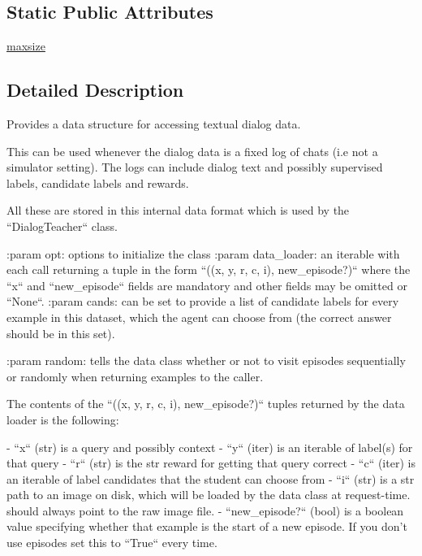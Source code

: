 \subsection*{Static Public Attributes}
\begin{DoxyCompactItemize}
\item 
\hyperlink{classparlai_1_1core_1_1teachers_1_1DialogData_a9c25f1914274bbc5b6aeae335e98957a}{maxsize}
\end{DoxyCompactItemize}


\subsection{Detailed Description}
\begin{DoxyVerb}Provides a data structure for accessing textual dialog data.

This can be used whenever the dialog data is a fixed log of chats
(i.e not a simulator setting). The logs can include dialog text and possibly
supervised labels, candidate labels and rewards.

All these are stored in this internal data format which is used by the
``DialogTeacher`` class.

:param opt:
    options to initialize the class
:param data_loader:
    an iterable with each call returning a tuple in the form
    ``((x, y, r, c, i), new_episode?)`` where the ``x`` and ``new_episode``
    fields are mandatory and other fields may be omitted or ``None``.
:param cands:
    can be set to provide a list of candidate labels for every example in
    this dataset, which the agent can choose from (the correct answer
    should be in this set).

:param random:
    tells the data class whether or not to visit episodes sequentially or
    randomly when returning examples to the caller.

The contents of the ``((x, y, r, c, i), new_episode?)`` tuples returned by
the data loader is the following:

- ``x`` (str) is a query and possibly context
- ``y`` (iter) is an iterable of label(s) for that query
- ``r`` (str) is the str reward for getting that query correct
- ``c`` (iter) is an iterable of label candidates that the student can choose from
- ``i`` (str) is a str path to an image on disk, which will be loaded by the
  data class at request-time. should always point to the raw image file.
- ``new_episode?`` (bool) is a boolean value specifying whether that example
  is the start of a new episode. If you don't use episodes set this
  to ``True`` every time.
\end{DoxyVerb}
 

